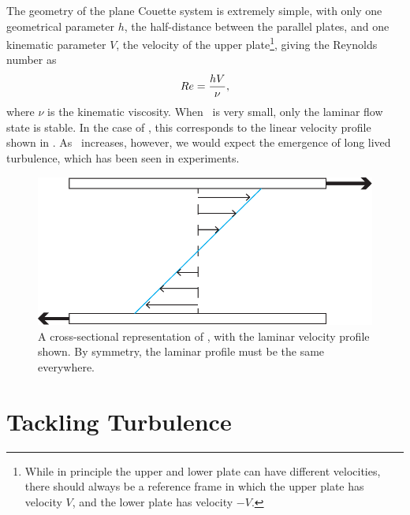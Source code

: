 The geometry of the plane Couette system is extremely simple, with only one geometrical parameter $h$, the half-distance between the parallel plates, and one kinematic parameter $V$, the velocity of the upper plate\footnote{While in principle the upper and lower plate can have different velocities, there should always be a reference frame in which the upper plate has velocity $V$, and the lower plate has velocity $-V$.}, giving the Reynolds number as 
\begin{equation}
Re = \dfrac{hV}{\nu},
\end{equation}
where $\nu$ is the kinematic viscosity. When \ReN~is very small, only the laminar flow state is stable. In the case of \pCf, this corresponds to the linear velocity profile shown in . As \ReN~increases, however, we would expect the emergence of long lived turbulence, which has been seen in experiments.
\begin{figure}
\centerline{
\includegraphics[scale=0.6]{Figs/planeCouetteMeanFlow}}
\caption{A cross-sectional representation of \pCf, with the laminar velocity profile shown. By symmetry, the laminar profile must be the same everywhere.}\label{fig:planeCouetteBulk}
\end{figure}

\section{Tackling Turbulence} 

